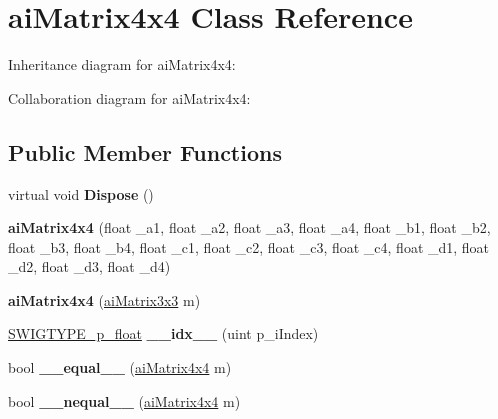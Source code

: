 \hypertarget{structai_matrix4x4}{\section{ai\+Matrix4x4 Class Reference}
\label{structai_matrix4x4}
}


Inheritance diagram for ai\+Matrix4x4\+:


Collaboration diagram for ai\+Matrix4x4\+:
\subsection*{Public Member Functions}
\begin{DoxyCompactItemize}
\item 
\hypertarget{structai_matrix4x4_a61c914ac55b539685f3b04e9807dbc18}{virtual void {\bfseries Dispose} ()}\label{structai_matrix4x4_a61c914ac55b539685f3b04e9807dbc18}

\item 
\hypertarget{structai_matrix4x4_a0a8b867aeaab27137101c0291b6a6754}{{\bfseries ai\+Matrix4x4} (float \+\_\+a1, float \+\_\+a2, float \+\_\+a3, float \+\_\+a4, float \+\_\+b1, float \+\_\+b2, float \+\_\+b3, float \+\_\+b4, float \+\_\+c1, float \+\_\+c2, float \+\_\+c3, float \+\_\+c4, float \+\_\+d1, float \+\_\+d2, float \+\_\+d3, float \+\_\+d4)}\label{structai_matrix4x4_a0a8b867aeaab27137101c0291b6a6754}

\item 
\hypertarget{structai_matrix4x4_a1f611e6c6dc45752d8a6178881e75228}{{\bfseries ai\+Matrix4x4} (\hyperlink{structai_matrix3x3}{ai\+Matrix3x3} m)}\label{structai_matrix4x4_a1f611e6c6dc45752d8a6178881e75228}

\item 
\hypertarget{structai_matrix4x4_a34e7c4a5202e772d13573c95297edc95}{\hyperlink{class_s_w_i_g_t_y_p_e__p__float}{S\+W\+I\+G\+T\+Y\+P\+E\+\_\+p\+\_\+float} {\bfseries \+\_\+\+\_\+idx\+\_\+\+\_\+} (uint p\+\_\+i\+Index)}\label{structai_matrix4x4_a34e7c4a5202e772d13573c95297edc95}

\item 
\hypertarget{structai_matrix4x4_ab887e65ca78e6c9913be46c5f3e99bf1}{bool {\bfseries \+\_\+\+\_\+equal\+\_\+\+\_\+} (\hyperlink{structai_matrix4x4}{ai\+Matrix4x4} m)}\label{structai_matrix4x4_ab887e65ca78e6c9913be46c5f3e99bf1}

\item 
\hypertarget{structai_matrix4x4_ac3a5583eebbdd082e103a6637f720895}{bool {\bfseries \+\_\+\+\_\+nequal\+\_\+\+\_\+} (\hyperlink{structai_matrix4x4}{ai\+Matrix4x4} m)}\label{structai_matrix4x4_ac3a5583eebbdd082e103a6637f720895}


\end{DoxyCompactItemize}

